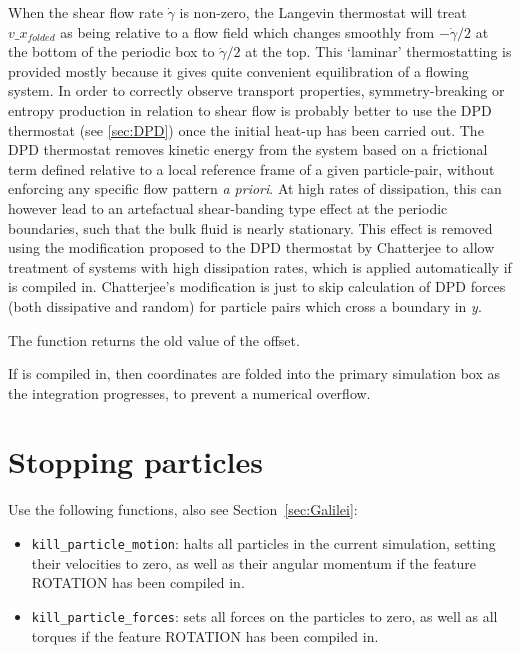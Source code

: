 When the shear flow rate $\dot{\gamma}$ is non-zero, the Langevin thermostat will treat $v\_x_{folded}$ as being relative to a flow field which changes smoothly from $-\dot{\gamma}/2$ at the bottom of the periodic box to $\dot{\gamma}/2$ at the top.  
This `laminar' thermostatting is provided mostly because it gives quite convenient equilibration of a flowing system.  In order to correctly observe transport properties, symmetry-breaking or entropy production in relation to shear flow is probably better to use the DPD thermostat (see \vref{sec:DPD}) once the initial heat-up has been carried out.  
The DPD thermostat removes kinetic energy from the system based on a frictional term defined relative to a local reference frame of a given particle-pair, without enforcing any specific flow pattern {\it a priori}.  At high rates of dissipation, this can however lead to an artefactual  shear-banding type effect at the periodic boundaries, such that the bulk fluid is nearly stationary.  
This effect is removed using the modification proposed to the DPD thermostat by Chatterjee \cite{chatterjee2007} to allow treatment of systems with high dissipation rates, which is applied automatically if  is compiled in.  Chatterjee's modification is just to skip calculation of DPD forces (both dissipative and random) for particle pairs which cross a boundary in {\it y}.

The function returns the old value of the offset.

If  is compiled in, then coordinates are folded into the primary simulation box as the integration progresses, to prevent a numerical overflow.  

\section{Stopping particles}

Use the following functions, also see Section~\ref{sec:Galilei}:
\begin{itemize}
\item \texttt{kill\_particle\_motion}: halts all particles in the
  current simulation, setting their velocities to zero, as well as
  their angular momentum if the feature ROTATION has been compiled in.
\item \texttt{kill\_particle\_forces}: sets all forces on the
  particles to zero, as well as all torques if the feature ROTATION
  has been compiled in.
\end{itemize}

